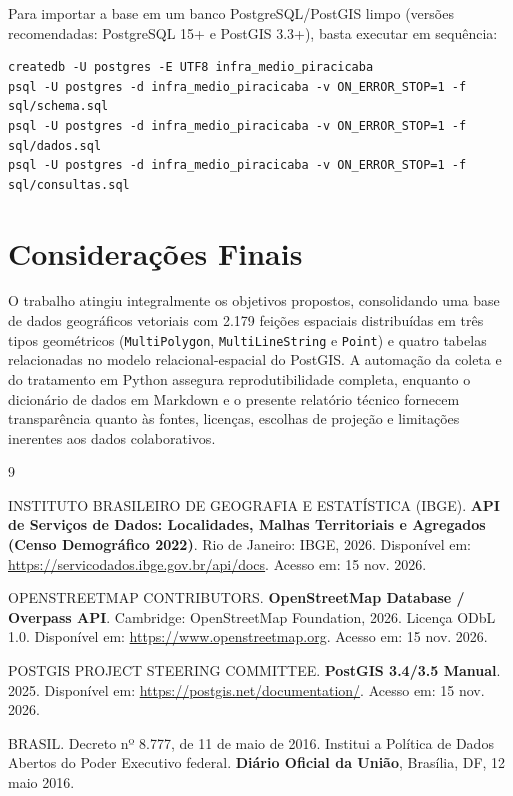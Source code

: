 \documentclass[
    12pt,
    oneside,
    a4paper,
    chapter=TITLE,
    section=TITLE,
    brazil
]{abntex2}
\begin{document}
Para importar a base em um banco PostgreSQL/PostGIS limpo (versões recomendadas: PostgreSQL 15+ e PostGIS 3.3+), basta executar em sequência:

\begin{verbatim}
createdb -U postgres -E UTF8 infra_medio_piracicaba
psql -U postgres -d infra_medio_piracicaba -v ON_ERROR_STOP=1 -f sql/schema.sql
psql -U postgres -d infra_medio_piracicaba -v ON_ERROR_STOP=1 -f sql/dados.sql
psql -U postgres -d infra_medio_piracicaba -v ON_ERROR_STOP=1 -f sql/consultas.sql
\end{verbatim}

\chapter{Considerações Finais}

O trabalho atingiu integralmente os objetivos propostos, consolidando uma base de dados geográficos vetoriais com 2.179 feições espaciais distribuídas em três tipos geométricos (\texttt{MultiPolygon}, \texttt{MultiLineString} e \texttt{Point}) e quatro tabelas relacionadas no modelo relacional-espacial do PostGIS. A automação da coleta e do tratamento em Python assegura reprodutibilidade completa, enquanto o dicionário de dados em Markdown e o presente relatório técnico fornecem transparência quanto às fontes, licenças, escolhas de projeção e limitações inerentes aos dados colaborativos.

\begin{thebibliography}{9}

INSTITUTO BRASILEIRO DE GEOGRAFIA E ESTATÍSTICA (IBGE). \textbf{API de Serviços de Dados: Localidades, Malhas Territoriais e Agregados (Censo Demográfico 2022)}. Rio de Janeiro: IBGE, 2026. Disponível em: \url{https://servicodados.ibge.gov.br/api/docs}. Acesso em: 15 nov. 2026.

OPENSTREETMAP CONTRIBUTORS. \textbf{OpenStreetMap Database / Overpass API}. Cambridge: OpenStreetMap Foundation, 2026. Licença ODbL 1.0. Disponível em: \url{https://www.openstreetmap.org}. Acesso em: 15 nov. 2026.

POSTGIS PROJECT STEERING COMMITTEE. \textbf{PostGIS 3.4/3.5 Manual}. 2025. Disponível em: \url{https://postgis.net/documentation/}. Acesso em: 15 nov. 2026.

BRASIL. Decreto nº 8.777, de 11 de maio de 2016. Institui a Política de Dados Abertos do Poder Executivo federal. \textbf{Diário Oficial da União}, Brasília, DF, 12 maio 2016.

\end{thebibliography}
\end{document}
